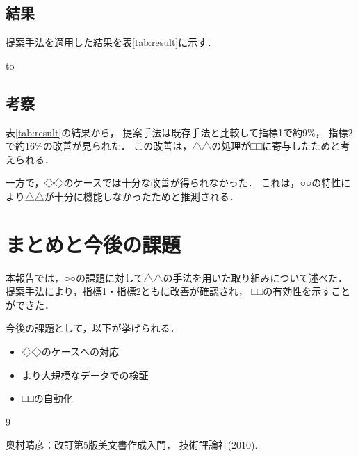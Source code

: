 \documentclass[submit,techrep,noauthor]{ipsj}
\begin{document}

\subsection{結果}

提案手法を適用した結果を表\ref{tab:result}に示す．

\begin{table}[tb]
\caption{分析結果の比較}
\label{tab:result}
\hbox to
\end{table}

\subsection{考察}

表\ref{tab:result}の結果から，
提案手法は既存手法と比較して指標1で約9\%，
指標2で約16\%の改善が見られた．
この改善は，△△の処理が□□に寄与したためと考えられる．

一方で，◇◇のケースでは十分な改善が得られなかった．
これは，○○の特性により△△が十分に機能しなかったためと推測される．

\section{まとめと今後の課題}
\label{sec:conclusion}

本報告では，○○の課題に対して△△の手法を用いた取り組みについて述べた．
提案手法により，指標1・指標2ともに改善が確認され，
□□の有効性を示すことができた．

今後の課題として，以下が挙げられる．

\begin{itemize}
\item ◇◇のケースへの対応
\item より大規模なデータでの検証
\item □□の自動化
\end{itemize}


\begin{thebibliography}{9}

奥村晴彦：改訂第5版\LaTeXe 美文書作成入門，
技術評論社(2010).


\end{thebibliography}
\end{document}

